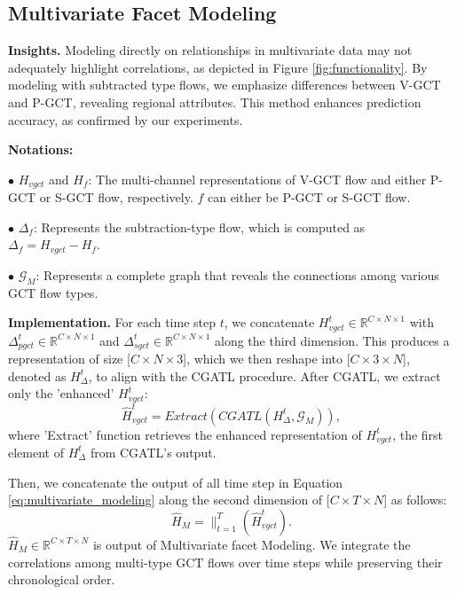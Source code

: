 \documentclass[letterpaper]{article} %
\begin{document}
\subsection{Multivariate Facet Modeling}
\label{multivariate_view_modeling}
\noindent \textbf{Insights.}
Modeling directly on relationships in multivariate data may not adequately highlight correlations, as depicted in Figure \ref{fig:functionality}. By modeling with subtracted type flows, we emphasize differences between V-GCT and P-GCT, revealing regional attributes. This method enhances prediction accuracy, as confirmed by our experiments.

\noindent \textbf{Notations:}

$\bullet$ $H_{vgct}$ and $H_{f}$: The multi-channel representations of V-GCT flow and either P-GCT or S-GCT flow, respectively. $f$ can either be P-GCT or S-GCT flow.

$\bullet$ $\Delta_{f}$: Represents the subtraction-type flow, which is computed as $\Delta_{f} = H_{vgct} - H_{f}$.

$\bullet$ $\mathcal{G}_{M}$: Represents a complete graph that reveals the connections among various GCT flow types.


\noindent \textbf{Implementation.}
For each time step $t$, we concatenate $H_{vgct}^{t} \in \mathbb{R}^{C \times N \times 1} $ with $\Delta_{pgct}^{t} \in \mathbb{R}^{C \times N \times 1}$ and $\Delta_{sgct}^{t} \in \mathbb{R}^{C \times N \times 1}$ along the third dimension. This produces a representation of size [$C \times N \times 3 $], which we then reshape into [$C \times 3 \times N $], denoted as $H_{\Delta}^{t}$, to align with the CGATL procedure. After CGATL, we extract only the 'enhanced' $H_{vgct}^{t}$:
\begin{equation}
\hat{H}_{vgct}^{t} = Extract( CGATL(H_{\Delta}^{t},\mathcal{G}_{M})),
\label{eq:multivariate_modeling}
\end{equation}
where 'Extract' function retrieves the enhanced representation of $H_{vgct}^{t}$, the first element of $H_{\Delta}^{t}$ from CGATL's output.

Then, we concatenate the output of all time step in Equation \ref{eq:multivariate_modeling} along the second dimension of [$C \times T \times N$] as follows:
\begin{equation}
\hat{H}_{M}=\|_{t=1}^{T}(\hat{H}_{vgct}^{t}).
\label{eq:temporal_concat}
\end{equation}
$\hat{H}_{M} \in \mathbb{R}^{C \times T \times N}$ is output of Multivariate facet Modeling. We integrate the correlations among multi-type GCT flows over time steps while preserving their chronological order.
\end{document}
